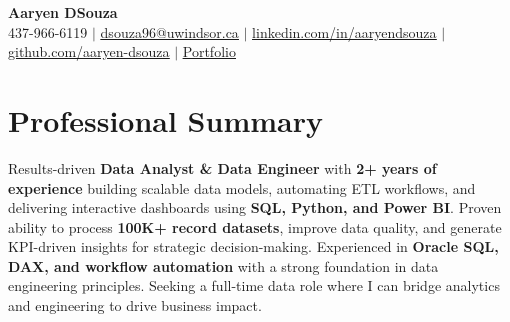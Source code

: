 \documentclass[letterpaper,11pt]{article}
\begin{document}

\begin{center}
	\textbf{\Huge Aaryen DSouza} \\ \vspace{1.5pt}
	\small 437-966-6119 $|$ \href{mailto:dsouza96@uwindsor.ca}{\underline{\phantom{/}dsouza96@uwindsor.ca\phantom{/}}} $|$
	\href{https://www.linkedin.com/in/aaryendsouza}{\underline{\phantom{/}linkedin.com/in/aaryendsouza\phantom{/}}} $|$
	\href{https://github.com/aaryen-dsouza}{\underline{\phantom{/}github.com/aaryen-dsouza\phantom{/}}} $|$
	\href{https://www.aaryen.vercel.app}{\underline{\phantom{/}Portfolio\phantom{/}}}
\end{center}

\section{Professional Summary}
\begin{itemize}[leftmargin=0in, label={}]
    \small{\item{
    Results-driven \textbf{Data Analyst \& Data Engineer} with \textbf{2+ years of experience} building scalable data models, automating ETL workflows, and delivering interactive dashboards using \textbf{SQL, Python, and Power BI}. Proven ability to process \textbf{100K+ record datasets}, improve data quality, and generate KPI-driven insights for strategic decision-making. Experienced in \textbf{Oracle SQL, DAX, and workflow automation} with a strong foundation in data engineering principles. Seeking a full-time data role where I can bridge analytics and engineering to drive business impact.
    }}
\end{itemize}

\end{document}
